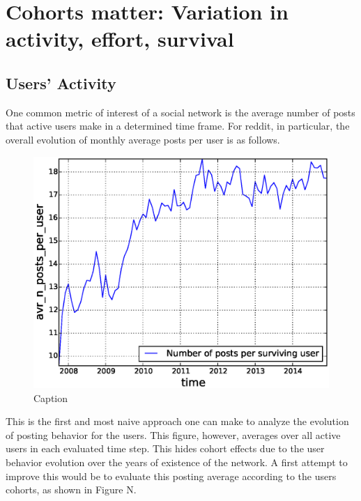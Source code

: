 \section{Cohorts matter: Variation in activity, effort, survival}

\subsection{Users' Activity}

One common metric of interest of a social network is the average number of posts that active users make in a determined time frame. For reddit, in particular, the overall evolution of monthly average posts per user is as follows.

\begin{figure}[!tb]
\centering
\includegraphics[scale=0.4]{./images/avr_posts_per_user_over_time_total.eps}
\caption{Caption}
\label{fig:avr_posts_per_user_over_time_total}
\end{figure}

This is the first and most naive approach one can make to analyze the evolution of posting behavior for the users. This figure, however, averages over all active users in each evaluated time step. This hides cohort effects due to the user behavior evolution over the years of existence of the network. A first attempt to improve this would be to evaluate this posting average according to the users cohorts, as shown in Figure N.


